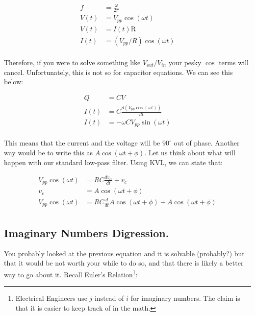 \documentclass[12pt]{report}
\newcommand{\pr}[1]{\left(#1\right)}
\newcommand{\Vpp}{{ V}_{ pp}}
\newcommand{\Vo}{{V}_{out}}
\newcommand{\Vi}{{V}_{in}}
\begin{document}
\begin{equation} \label{freq1}
\begin{split}
f &= \frac{\omega}{2\pi}\\
V(t) &= \Vpp \cos\pr{\omega t} \\
V(t) &= I(t)\mathrm{R} \\
I(t) & = \pr{\Vpp / {R}} \cos\pr{\omega t}\\
\end{split}
\end{equation}\newline

Therefore, if you were to solve something like $\Vo / \Vi$ your pesky $\cos$ terms will cancel. Unfortunately, this is not so for capacitor equations. We can see this below: 

\begin{equation} \label{freq2}
\begin{split}
Q &= CV \\
I(t) &= C \frac{d \pr{\Vpp \cos\pr{\omega t}}}{dt} \\
I(t) &= - \omega C \Vpp \sin \pr{\omega t} \\
\end{split}
\end{equation}\newline

This means that the current and the voltage will be $90^{\circ}$ out of phase. Another way would be to write this as $A \cos \pr{\omega t + \phi}$. Let us think about what will happen with our standard low-pass filter. Using KVL, we can state that: 

\begin{equation} \label{freq3}
\begin{split}
\Vpp \cos\pr{\omega t} &= RC\frac{dv_C}{dt} + v_c \\ 
v_c &= A \cos \pr{\omega t + \phi} \\ 
\Vpp \cos\pr{\omega t} &= RC\frac{d}{dt}A \cos \pr{\omega t + \phi} + A \cos \pr{\omega t + \phi} \\
\end{split}
\end{equation}


\subsection{Imaginary Numbers Digression.}
You probably looked at the previous equation and it is solvable (probably?) but that it would be not worth your while to do so, and that there is likely a better way to go about it. Recall Euler's Relation\footnote{Electrical Engineers use $j$ instead of $i$ for imaginary numbers. The claim is that it is easier to keep track of in the math.}: 
\end{document}
